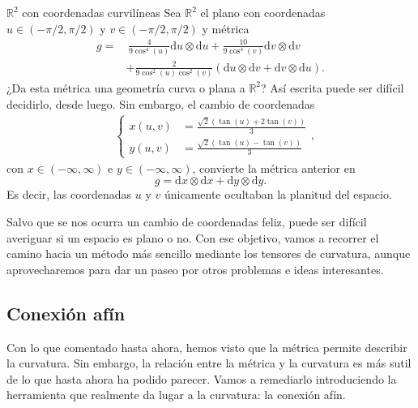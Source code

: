 \begin{example}
    {\(\mathbb{R}^2\) con coordenadas curvilíneas
    \label{ex.4-plano_curvilineas}}
    Sea \(\mathbb{R}^2\) el plano con coordenadas \(u\in(-\pi/2,\pi/2)\) y \(v\in(-\pi/2,\pi/2)\) y métrica
    \begin{align*}
        g =&\, \frac{4}{9\cos^4(u)}\mathrm{d}u\otimes\mathrm{d}u + \frac{10}{9\cos^4(v)}\mathrm{d}v\otimes\mathrm{d}v \\
        &+\frac{2}{9\cos^2(u)\cos^2(v)}\left(\mathrm{d}u\otimes\mathrm{d}v + \mathrm{d}v\otimes\mathrm{d}u \right).
    \end{align*}
    ¿Da esta métrica una geometría curva o plana a \(\mathbb{R}^2\)? Así escrita puede ser difícil decidirlo, desde luego. Sin embargo, el cambio de coordenadas
    \begin{align*}
        &\left\{
            \begin{aligned}
                x(u, v) &= \frac{\sqrt{2}(\tan(u)+2\tan(v))}{3}\\
                y(u, v) &= \frac{\sqrt{2}(\tan(u)-\tan(v))}{3}
            \end{aligned}
        \right.,
    \end{align*}
    con \(x\in(-\infty,\infty)\) e \(y\in(-\infty,\infty)\), convierte la métrica anterior en 
    \begin{equation*}
        g = \mathrm{d}x\otimes\mathrm{d}x + \mathrm{d}y\otimes\mathrm{d}y.
    \end{equation*}
    Es decir, las coordenadas \(u\) y \(v\) únicamente ocultaban la planitud del espacio. 
\end{example}

Salvo que se nos ocurra un cambio de coordenadas feliz, puede ser difícil averiguar si un espacio es plano o no. Con ese objetivo, vamos a recorrer el camino hacia un método más sencillo mediante los tensores de curvatura, aunque aprovecharemos para dar un paseo por otros problemas e ideas interesantes.

\subsection{Conexión afín}
\label{subsec4}

Con lo que comentado hasta ahora, hemos visto que la métrica permite describir la curvatura. Sin embargo, la relación entre la métrica y la curvatura es más sutil de lo que hasta ahora ha podido parecer. Vamos a remediarlo introduciendo la herramienta que realmente da lugar a la curvatura: la conexión afín. 

